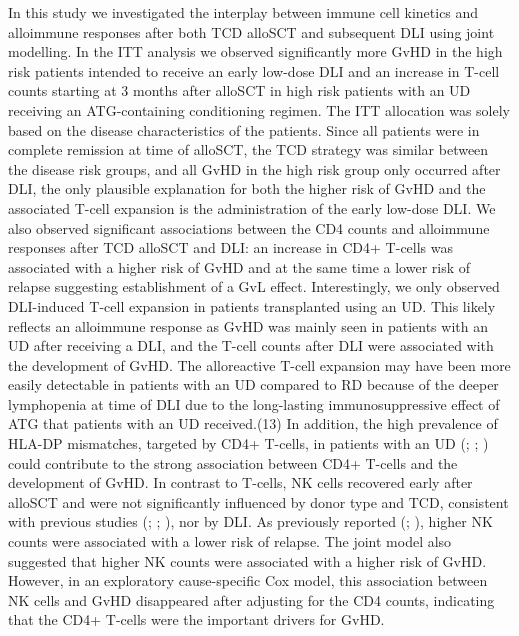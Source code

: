 \documentclass[
  letterpaper,
  DIV=11,
  numbers=noendperiod]{scrreprt}
\begin{document}
In this study we investigated the interplay between immune cell kinetics
and alloimmune responses after both TCD alloSCT and subsequent DLI using
joint modelling. In the ITT analysis we observed significantly more GvHD
in the high risk patients intended to receive an early low-dose DLI and
an increase in T-cell counts starting at 3 months after alloSCT in high
risk patients with an UD receiving an ATG-containing conditioning
regimen. The ITT allocation was solely based on the disease
characteristics of the patients. Since all patients were in complete
remission at time of alloSCT, the TCD strategy was similar between the
disease risk groups, and all GvHD in the high risk group only occurred
after DLI, the only plausible explanation for both the higher risk of
GvHD and the associated T-cell expansion is the administration of the
early low-dose DLI. We also observed significant associations between
the CD4 counts and alloimmune responses after TCD alloSCT and DLI: an
increase in CD4+ T-cells was associated with a higher risk of GvHD and
at the same time a lower risk of relapse suggesting establishment of a
GvL effect. Interestingly, we only observed DLI-induced T-cell expansion
in patients transplanted using an UD. This likely reflects an alloimmune
response as GvHD was mainly seen in patients with an UD after receiving
a DLI, and the T-cell counts after DLI were associated with the
development of GvHD. The alloreactive T-cell expansion may have been
more easily detectable in patients with an UD compared to RD because of
the deeper lymphopenia at time of DLI due to the long-lasting
immunosuppressive effect of ATG that patients with an UD received.(13)
In addition, the high prevalence of HLA-DP mismatches, targeted by CD4+
T-cells, in patients with an UD
(;
;
) could contribute to the strong association between CD4+ T-cells
and the development of GvHD. In contrast to T-cells, NK cells recovered
early after alloSCT and were not significantly influenced by donor type
and TCD, consistent with previous studies
(;
;
), nor by DLI. As previously reported
(; ), higher NK counts were associated with a lower
risk of relapse. The joint model also suggested that higher NK counts
were associated with a higher risk of GvHD. However, in an exploratory
cause-specific Cox model, this association between NK cells and GvHD
disappeared after adjusting for the CD4 counts, indicating that the CD4+
T-cells were the important drivers for GvHD.
\end{document}
